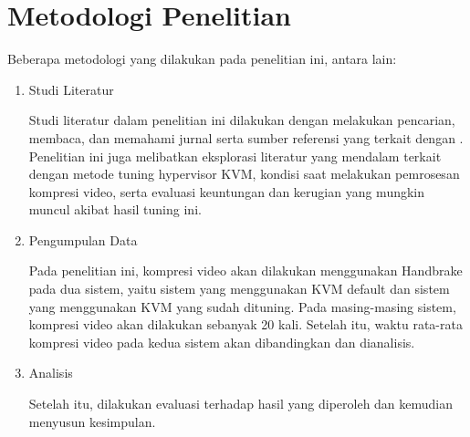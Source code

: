 

\section{Metodologi Penelitian}
Beberapa metodologi yang dilakukan pada penelitian ini, antara lain:
\begin{enumerate}
  \item Studi Literatur
  
  Studi literatur dalam penelitian ini dilakukan dengan melakukan pencarian, membaca, dan memahami jurnal serta sumber referensi yang terkait dengan \cc. Penelitian ini juga melibatkan eksplorasi literatur yang mendalam terkait dengan metode tuning hypervisor KVM, kondisi saat melakukan pemrosesan kompresi video, serta evaluasi keuntungan dan kerugian yang mungkin muncul akibat hasil tuning ini.
  
  \item Pengumpulan Data
  
  Pada penelitian ini, kompresi video akan dilakukan menggunakan Handbrake pada dua sistem, yaitu sistem yang menggunakan KVM default dan sistem yang menggunakan KVM yang sudah dituning. Pada masing-masing sistem, kompresi video akan dilakukan sebanyak 20 kali. Setelah itu, waktu rata-rata kompresi video pada kedua sistem akan dibandingkan dan dianalisis.
  
  \item Analisis
  
  Setelah itu, dilakukan evaluasi terhadap hasil yang diperoleh dan kemudian menyusun kesimpulan.
\end{enumerate}


